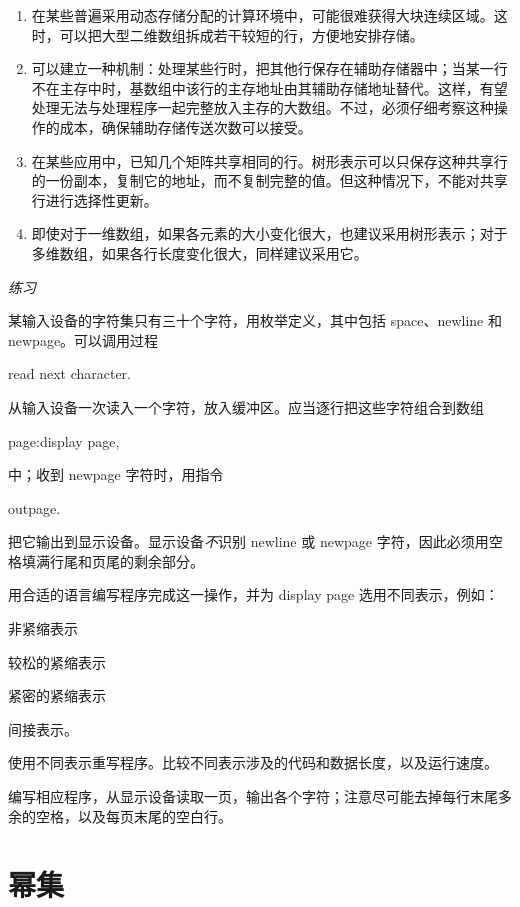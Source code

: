 \documentclass[twoside,11pt,fontset=none]{ctexbook}
\begin{document}
\begin{enumerate}[wide, nosep, label=(\arabic*)]
	\item 在某些普遍采用动态存储分配的计算环境中，可能很难获得大块连续区域。这时，可以把大型二维数组拆成若干较短的行，方便地安排存储。

	\item 可以建立一种机制：处理某些行时，把其他行保存在辅助存储器中；当某一行不在主存中时，基数组中该行的主存地址由其辅助存储地址替代。这样，有望处理无法与处理程序一起完整放入主存的大数组。不过，必须仔细考察这种操作的成本，确保辅助存储传送次数可以接受。

	\item 在某些应用中，已知几个矩阵共享相同的行。树形表示可以只保存这种共享行的一份副本，复制它的地址，而不复制完整的值。但这种情况下，不能对共享行进行选择性更新。

	\item 即使对于一维数组，如果各元素的大小变化很大，也建议采用树形表示；对于多维数组，如果各行长度变化很大，同样建议采用它。
\end{enumerate}

\noindent
\textit{练习}
\nopagebreak

\noindent
某输入设备的字符集只有三十个字符，用枚举定义，其中包括 space、newline 和 newpage。可以调用过程

\quad read next character.

\noindent
从输入设备一次读入一个字符，放入缓冲区。应当逐行把这些字符组合到数组

\quad page:display page,

\noindent
中；收到 newpage 字符时，用指令

\quad outpage.

\noindent
把它输出到显示设备。显示设备\textit{不}识别 newline 或 newpage 字符，因此必须用空格填满行尾和页尾的剩余部分。

用合适的语言编写程序完成这一操作，并为 display page 选用不同表示，例如：

\quad 非紧缩表示

\quad 较松的紧缩表示

\quad 紧密的紧缩表示

\quad 间接表示。

\noindent
使用不同表示重写程序。比较不同表示涉及的代码和数据长度，以及运行速度。

编写相应程序，从显示设备读取一页，输出各个字符；注意尽可能去掉每行末尾多余的空格，以及每页末尾的空白行。
\section[幂集]{幂集}
\end{document}
